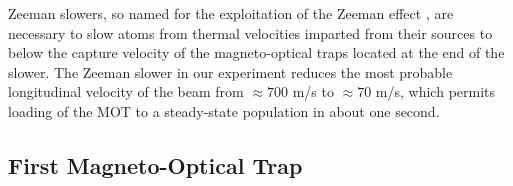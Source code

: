 	Zeeman slowers, so named for the exploitation of the Zeeman effect , are necessary to slow atoms from thermal velocities imparted from their sources to below the capture velocity of the magneto-optical traps located at the end of the slower. The Zeeman slower in our experiment \cite{dedman04}  reduces the most probable longitudinal velocity of the beam from $\approx700$ m/s to $\approx70$ m/s, which permits loading of the MOT to a steady-state population in about one second.


\subsection*{First Magneto-Optical Trap}

